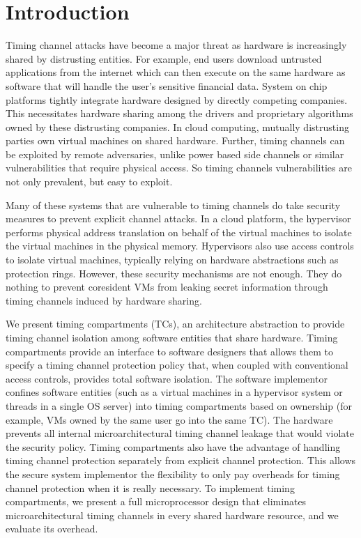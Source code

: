 \section{Introduction}
Timing channel attacks have become a major threat as hardware is increasingly 
shared by distrusting entities. For example, end users download untrusted 
applications from the internet which can then execute on the same hardware as 
software that will handle the user's sensitive financial data. System on chip 
platforms tightly integrate hardware designed by directly competing companies.  
This necessitates hardware sharing among the drivers and proprietary algorithms 
owned by these distrusting companies. In cloud computing, mutually distrusting 
parties own virtual machines on shared hardware. Further, timing channels can 
be exploited by remote adversaries, unlike power based side channels or similar 
vulnerabilities that require physical access. So timing channels 
vulnerabilities are not only prevalent, but easy to exploit.

Many of these systems that are vulnerable to timing channels do take security 
measures to prevent explicit channel attacks. In a cloud platform, the 
hypervisor performs physical address translation on behalf of the virtual 
machines to isolate the virtual machines in the physical memory. Hypervisors 
also use access controls to isolate virtual machines, typically relying on 
hardware abstractions such as protection rings. However, these security 
mechanisms are not enough. They do nothing to prevent coresident VMs from 
leaking secret information through timing channels induced by hardware sharing.

We present timing compartments (TCs), an architecture abstraction to provide 
timing channel isolation among software entities that share hardware.
Timing compartments provide an interface to software designers that allows them 
to specify a timing channel protection policy that, when coupled with 
conventional access controls, provides total software isolation. The software 
implementor confines software entities (such as a virtual machines in a 
hypervisor system or threads in a single OS server) into timing
compartments based on ownership (for example, VMs owned by the same user go 
into the same TC). The hardware prevents all internal microarchitectural timing 
channel leakage that would violate the security policy. Timing compartments 
also have the advantage of handling timing channel protection separately from 
explicit channel protection. This allows the secure system implementor the 
flexibility to only pay overheads for timing channel protection when it is 
really necessary. To implement timing compartments, we present a full 
microprocessor design that eliminates microarchitectural timing channels in 
every shared hardware resource, and we evaluate its overhead.

